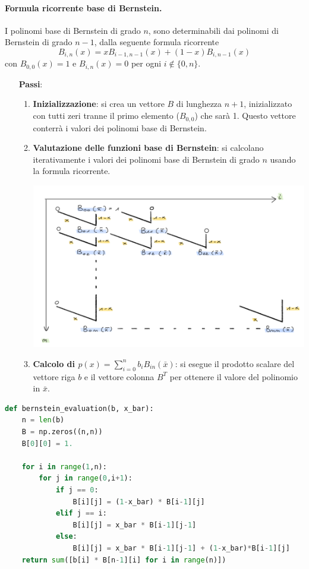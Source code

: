\documentclass{article}
\numberwithin{equation}{section}
\begin{document}
\paragraph{Formula ricorrente base di Bernstein.}
I polinomi base di Bernstein di grado $n$, sono determinabili dai polinomi di
Bernstein di grado $n-1$, dalla seguente formula ricorrente
$$B_{i,n}(x)=xB_{i-1,n-1}(x)+(1-x)B_{i,n-1}(x)$$
con $B_{0,0}(x)=1$ e $B_{i,n}(x)=0$ per ogni $i\notin\{0,n\}$.
\begin{itemize}
    \item[\textbf{Passi}:]
    \begin{enumerate}
        \item \textbf{Inizializzazione}: si crea un vettore $B$ di lunghezza $n+1$, 
            inizializzato con tutti zeri tranne il primo elemento ($B_{0,0}$) che
            sarà 1. Questo vettore conterrà i valori dei polinomi base di
            Bernstein.
        \item \textbf{Valutazione delle funzioni base di Bernstein}: si calcolano
            iterativamente i valori dei polinomi base di Bernstein di grado $n$
            usando la formula ricorrente.
            \begin{center}
                \includegraphics[width=0.8\linewidth]{bernstein_ricorsive}
            \end{center}
        \item \textbf{Calcolo di
            $p(x)=\displaystyle\sum_{i=0}^{n}b_iB_{in}(\bar{x})$}: si esegue il prodotto
            scalare del vettore riga $b$ e
            il vettore colonna $B^T$ per ottenere il valore del polinomio in
            $\bar{x}$.
    \end{enumerate}
\end{itemize}
\begin{lstlisting}[language=Python]
def bernstein_evaluation(b, x_bar):
    n = len(b)
    B = np.zeros((n,n))
    B[0][0] = 1.

    for i in range(1,n):
        for j in range(0,i+1):
            if j == 0:
                B[i][j] = (1-x_bar) * B[i-1][j]
            elif j == i:
                B[i][j] = x_bar * B[i-1][j-1]
            else:
                B[i][j] = x_bar * B[i-1][j-1] + (1-x_bar)*B[i-1][j]
    return sum([b[i] * B[n-1][i] for i in range(n)])
\end{lstlisting}
\end{document}
